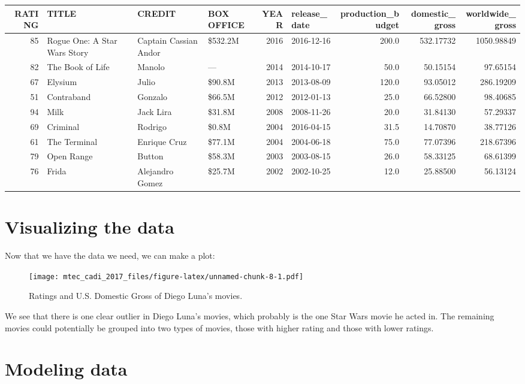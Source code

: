 \documentclass[]{book}
\theoremstyle{definition}
\theoremstyle{definition}
\theoremstyle{remark}
\begin{document}
\begin{tabular}{r|l|l|l|r|l|r|r|r}
\hline
RATING & TITLE & CREDIT & BOX OFFICE & YEAR & release\_date & production\_budget & domestic\_gross & worldwide\_gross\\
\hline
85 & Rogue One: A Star Wars Story & Captain Cassian Andor & \$532.2M & 2016 & 2016-12-16 & 200.0 & 532.17732 & 1050.98849\\
\hline
82 & The Book of Life & Manolo & — & 2014 & 2014-10-17 & 50.0 & 50.15154 & 97.65154\\
\hline
67 & Elysium & Julio & \$90.8M & 2013 & 2013-08-09 & 120.0 & 93.05012 & 286.19209\\
\hline
51 & Contraband & Gonzalo & \$66.5M & 2012 & 2012-01-13 & 25.0 & 66.52800 & 98.40685\\
\hline
94 & Milk & Jack Lira & \$31.8M & 2008 & 2008-11-26 & 20.0 & 31.84130 & 57.29337\\
\hline
69 & Criminal & Rodrigo & \$0.8M & 2004 & 2016-04-15 & 31.5 & 14.70870 & 38.77126\\
\hline
61 & The Terminal & Enrique Cruz & \$77.1M & 2004 & 2004-06-18 & 75.0 & 77.07396 & 218.67396\\
\hline
79 & Open Range & Button & \$58.3M & 2003 & 2003-08-15 & 26.0 & 58.33125 & 68.61399\\
\hline
76 & Frida & Alejandro Gomez & \$25.7M & 2002 & 2002-10-25 & 12.0 & 25.88500 & 56.13124\\
\hline
\end{tabular}

\section{Visualizing the data}\label{visualizing-the-data}

Now that we have the data we need, we can make a plot:

\begin{figure}
\centering
\texttt{[image: mtec\_cadi\_2017\_files/figure-latex/unnamed-chunk-8-1.pdf]}
\caption{\label{fig:unnamed-chunk-8}Ratings and U.S. Domestic Gross of Diego
Luna's movies.}
\end{figure}

We see that there is one clear outlier in Diego Luna's movies, which
probably is the one Star Wars movie he acted in. The remaining movies
could potentially be grouped into two types of movies, those with higher
rating and those with lower ratings.

\section{Modeling data}\label{modeling-data}
\end{document}
